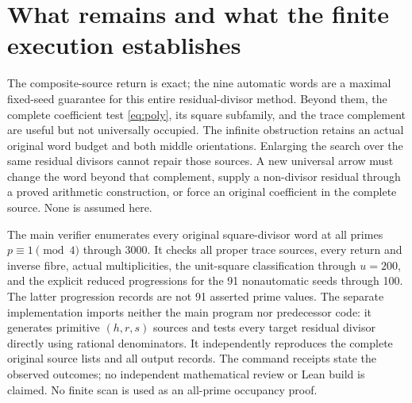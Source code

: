 \section{What remains and what the finite execution establishes}
The composite-source return is exact; the nine automatic words are a maximal
fixed-seed guarantee for this entire residual-divisor method. Beyond them, the
complete coefficient test \eqref{eq:poly}, its square subfamily, and the trace
complement are useful but not universally occupied. The infinite obstruction
retains an actual original word budget and both middle orientations. Enlarging
the search over the same residual divisors cannot repair those sources.
A new universal arrow must change the word beyond that complement, supply a
non-divisor residual through a proved arithmetic construction, or force an
original coefficient in the complete source. None is assumed here.

The main verifier enumerates every original square-divisor word at all primes
$p\equiv1\pmod4$ through 3000. It checks all proper trace sources, every return
and inverse fibre, actual multiplicities, the unit-square classification through
$u=200$, and the explicit reduced progressions for the 91 nonautomatic seeds
through 100. The latter progression records are not 91 asserted prime values.
The separate implementation imports neither the main program nor predecessor
code: it generates primitive $(h,r,s)$ sources and tests every target residual
divisor directly using rational denominators. It independently reproduces the
complete original source lists and all output records. The command receipts
state the observed outcomes; no independent mathematical review or Lean build
is claimed. No finite scan is used as an all-prime occupancy proof.
